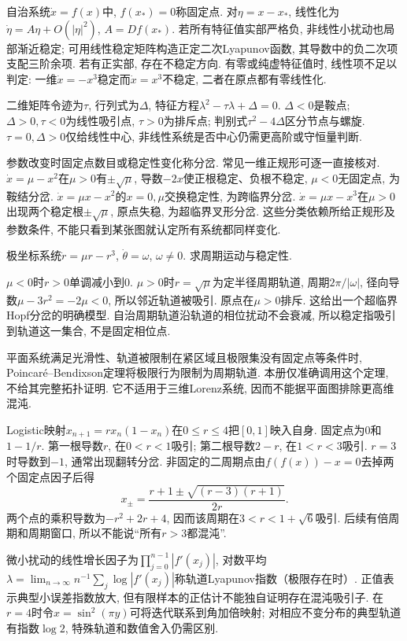 自治系统$\dot x=f(x)$中, $f(x_*)=0$称固定点. 对$\eta=x-x_*$, 线性化为$\dot\eta=A\eta+O(|\eta|^2)$, $A=Df(x_*)$. 若所有特征值实部严格负, 非线性小扰动也局部渐近稳定; 可用线性稳定矩阵构造正定二次Lyapunov函数, 其导数中的负二次项支配三阶余项. 若有正实部, 存在不稳定方向. 有零或纯虚特征值时, 线性项不足以判定: 一维$\dot x=-x^3$稳定而$\dot x=x^3$不稳定, 二者在原点都有零线性化.

二维矩阵令迹为$\tau$, 行列式为$\Delta$, 特征方程$\lambda^2-\tau\lambda+\Delta=0$. $\Delta<0$是鞍点; $\Delta>0,\tau<0$为线性吸引点, $\tau>0$为排斥点; 判别式$\tau^2-4\Delta$区分节点与螺旋. $\tau=0,\Delta>0$仅给线性中心, 非线性系统是否中心仍需更高阶或守恒量判断.

参数改变时固定点数目或稳定性变化称分岔. 常见一维正规形可逐一直接核对. $\dot x=\mu-x^2$在$\mu>0$有$\pm\sqrt\mu$, 导数$-2x$使正根稳定、负根不稳定, $\mu<0$无固定点, 为鞍结分岔. $\dot x=\mu x-x^2$的$x=0,\mu$交换稳定性, 为跨临界分岔. $\dot x=\mu x-x^3$在$\mu>0$出现两个稳定根$\pm\sqrt\mu$, 原点失稳, 为超临界叉形分岔. 这些分类依赖所给正规形及参数条件, 不能只看到某张图就认定所有系统都同样变化.

\begin{example}
极坐标系统$\dot r=\mu r-r^3$, $\dot\theta=\omega$, $\omega\ne0$. 求周期运动与稳定性.
\end{example}
\begin{solution}
$\mu<0$时$r>0$单调减小到0. $\mu>0$时$r=\sqrt\mu$为定半径周期轨道, 周期$2\pi/|\omega|$, 径向导数$\mu-3r^2=-2\mu<0$, 所以邻近轨道被吸引. 原点在$\mu>0$排斥. 这给出一个超临界Hopf分岔的明确模型. 自治周期轨道沿轨道的相位扰动不会衰减, 所以稳定指吸引到轨道这一集合, 不是固定相位点.
\end{solution}
平面系统满足光滑性、轨道被限制在紧区域且极限集没有固定点等条件时, Poincaré--Bendixson定理将极限行为限制为周期轨道. 本册仅准确调用这个定理, 不给其完整拓扑证明. 它不适用于三维Lorenz系统, 因而不能据平面图排除更高维混沌.

Logistic映射$x_{n+1}=rx_n(1-x_n)$在$0\le r\le4$把$[0,1]$映入自身. 固定点为$0$和$1-1/r$. 第一根导数$r$, 在$0<r<1$吸引; 第二根导数$2-r$, 在$1<r<3$吸引. $r=3$时导数到$-1$, 通常出现翻转分岔. 非固定的二周期点由$f(f(x))-x=0$去掉两个固定点因子后得
\[
x_\pm=\frac{r+1\pm\sqrt{(r-3)(r+1)}}{2r}.
\]
两个点的乘积导数为$-r^2+2r+4$, 因而该周期在$3<r<1+\sqrt6$吸引. 后续有倍周期和周期窗口, 所以不能说“所有$r>3$都混沌”.

微小扰动的线性增长因子为$\prod_{j=0}^{n-1}|f'(x_j)|$, 对数平均$\lambda=\lim_{n\to\infty}n^{-1}\sum_j\log|f'(x_j)|$称轨道Lyapunov指数（极限存在时）. 正值表示典型小误差指数放大, 但有限样本的正估计不能独自证明存在混沌吸引子. 在$r=4$时令$x=\sin^2(\pi y)$可将迭代联系到角加倍映射; 对相应不变分布的典型轨道有指数$\log2$, 特殊轨道和数值舍入仍需区别.

